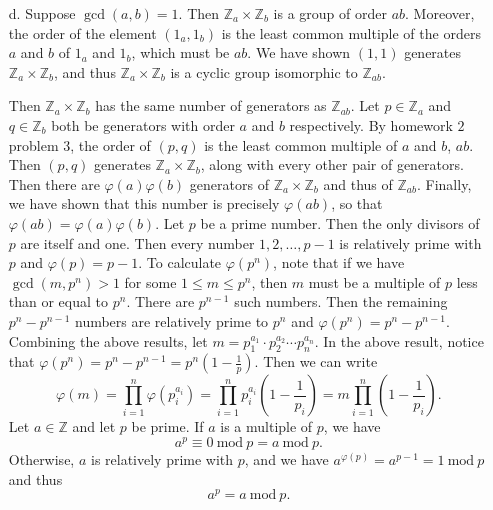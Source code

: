 \documentclass[11pt, reqno]{article}
\theoremstyle{plain}
\theoremstyle{definition}
\theoremstyle{remark}
\renewcommand{\phi}{\varphi}
\newcommand{\ZZ}{\mathbb{Z}}
\begin{document}
\begin{enumerate}
\begin{enumerate}
        \item[d.] Suppose $\gcd(a,b) = 1$. Then $\ZZ_a \times \ZZ_b$ is a group of order $ab$. Moreover,
        the order of the element $(1_a,1_b)$ is the least common multiple of the orders $a$ and $b$
        of $1_a$ and $1_b$, which must be $ab$. We have shown $(1,1)$ generates $\ZZ_a \times \ZZ_b$, and 
        thus $\ZZ_a \times \ZZ_b$ is a cyclic group isomorphic to $\ZZ_{ab}$. 

        Then $\ZZ_a \times \ZZ_b$ has the same number of generators as $\ZZ_{ab}$. Let $p \in \ZZ_a$
        and $q \in \ZZ_b$ both be generators with order $a$ and $b$ respectively. By homework $2$ problem 
        $3$, the order of $(p,q)$ is the least common multiple of $a$ and $b$, $ab$. Then $(p,q)$ generates
        $\ZZ_a \times \ZZ_b$, along with every other pair of generators. Then there are $\phi(a)\phi(b)$
        generators of $\ZZ_a \times \ZZ_b$ and thus of $\ZZ_{ab}$. Finally, we have shown that this 
        number is precisely $\phi(ab)$, so that $\phi(ab) = \phi(a)\phi(b)$.
        \bigbreak 
        Let $p$ be a prime number. Then the only divisors of $p$ are itself and one. Then 
        every number $1, 2, \dots, p-1$ is relatively prime with $p$ and $\phi(p) = p-1$.
        \bigbreak
        To calculate $\phi(p^n)$, note that if we have $\gcd(m, p^n) > 1$ for some $1 \leq m \leq p^n$, then $m$ must be 
        a multiple of $p$ less than or equal to $p^n$. There are $p^{n-1}$ such numbers. 
        Then the remaining $p^n - p^{n-1}$ numbers are relatively prime to $p^n$ and $\phi(p^n) = p^n - p^{n-1}$.
        \bigbreak 
        Combining the above results, let $m = p_1^{a_1}\cdot p_2^{a_2}\cdots p_n^{a_n}$. In the above
        result, notice that $\phi(p^n) = p^n - p^{n-1} = p^n(1 - \frac{1}{p})$. Then we can write 
        \[
            \phi(m) = \prod_{i = 1}^n \phi(p_i^{a_i}) = \prod_{i = 1}^n p_i^{a_i} (1 - \frac{1}{p_i}) = m \prod_{i = 1}^n (1 - \frac{1}{p_i}).
        \]
        \bigbreak
        Let $a \in \ZZ$ and let $p$ be prime. If $a$ is a multiple of $p$, we have 
        \[
            a^p \equiv 0\ \text{mod}\ p = a\ \text{mod}\ p.
        \]
        Otherwise, $a$ is relatively prime with $p$, and we have $a^{\phi(p)} = a^{p - 1} = 1\ \text{mod}\ p$ and thus 
        \[
            a^p = a\ \text{mod}\ p.
        \]

    \end{enumerate}


\end{enumerate}
\end{document}
